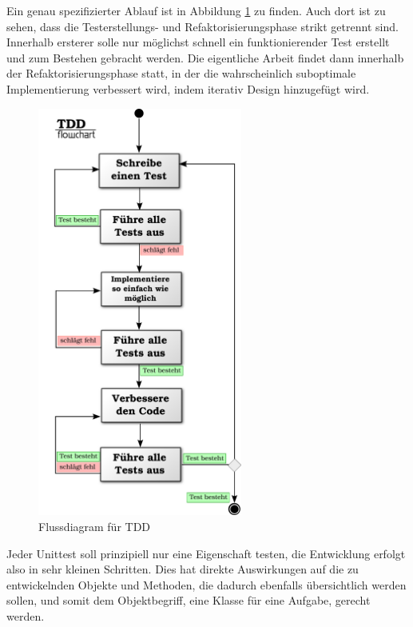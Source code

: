   Ein genau spezifizierter Ablauf ist in Abbildung \ref{fig:tddflow} zu finden. Auch dort ist zu sehen, dass die Testerstellungs- und Refaktorisierungsphase strikt getrennt sind. Innerhalb ersterer solle nur möglichst schnell ein funktionierender Test erstellt und zum Bestehen gebracht werden. Die eigentliche Arbeit findet dann innerhalb der Refaktorisierungsphase statt, in der die wahrscheinlich suboptimale Implementierung verbessert wird, indem iterativ Design hinzugefügt wird.
  \begin{figure}[hp]
 \centering
 \includegraphics[width=0.6\textwidth]{./diagrams/tdd-flowchart.pdf}
 \caption{Flussdiagram für TDD}
 \label{fig:tddflow}
\end{figure}


  Jeder Unittest soll prinzipiell nur eine Eigenschaft testen, die Entwicklung erfolgt also in sehr kleinen Schritten. Dies hat direkte Auswirkungen auf die zu entwickelnden Objekte und Methoden, die dadurch ebenfalls übersichtlich werden sollen, und somit dem Objektbegriff, eine Klasse für eine Aufgabe, gerecht werden.

